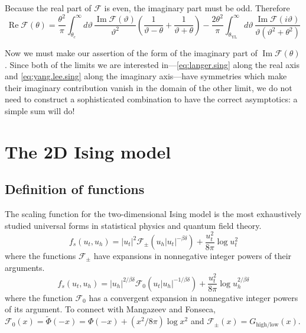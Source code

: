\documentclass[
  aps,
  pre,
  reprint,
  longbibliography,
  floatfix
]{revtex4-2}
\begin{document}
Because the real part of $\mathcal F$ is even, the imaginary part must be odd. Therefore
\begin{equation}
  \operatorname{Re}\mathcal F(\theta)
  =\frac{\theta^2}{\pi}
  \int_{\theta_c}^\infty d\vartheta\,\frac{\operatorname{Im}\mathcal F(\vartheta)}{\vartheta^2}\left(\frac1{\vartheta-\theta}+\frac1{\vartheta+\theta}\right)
  -\frac{2\theta^2}\pi\int_{\theta_{\mathrm{YL}}}^{\infty}d\vartheta\,\frac{\operatorname{Im}\mathcal F(i\vartheta)}{\vartheta(\vartheta^2+\theta^2)}
\end{equation}

Now we must make our assertion of the form of the imaginary part of $\operatorname{Im}\mathcal F(\theta)$. Since both of the limits we are interested in---\eqref{eq:langer.sing} along the real axis and \eqref{eq:yang.lee.sing} along the imaginary axis---have symmetries which make their imaginary contribution vanish in the domain of the other limit, we do not need to construct a sophisticated combination to have the correct asymptotics: a simple sum will do!



\section{The 2D Ising model}

\subsection{Definition of functions}

The scaling function for the two-dimensional Ising model is the most
exhaustively studied universal forms in statistical physics and quantum field
theory.
\begin{equation} \label{eq:free.energy.2d.low}
  f_s(u_t, u_h)
  = |u_t|^2\mathcal F_{\pm}(u_h|u_t|^{-\beta\delta})
    +\frac{u_t^2}{8\pi}\log u_t^2
\end{equation}
where the functions $\mathcal F_\pm$ have expansions in nonnegative integer powers of their arguments.
\begin{equation} \label{eq:free.energy.2d.mid}
  f_s(u_t, u_h)
  = |u_h|^{2/\beta\delta}\mathcal F_0(u_t|u_h|^{-1/\beta\delta})
    +\frac{u_t^2}{8\pi}\log u_h^{2/\beta\delta}
\end{equation}
where the function $\mathcal F_0$ has a convergent expansion in nonnegative integer powers of its argument.
To connect with Mangazeev and Fonseca, $\mathcal F_0(x)=\tilde\Phi(-x)=\Phi(-x)+(x^2/8\pi) \log x^2$ and $\mathcal F_\pm(x)=G_{\mathrm{high}/\mathrm{low}}(x)$.
\end{document}
